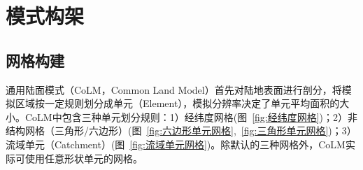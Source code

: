 \chapter{模式构架}\label{模式构架}
\section{网格构建}\label{网格构建}

通用陆面模式（CoLM，Common Land Model）首先对陆地表面进行剖分，将模拟区域按一定规则划分成单元（Element），模拟分辨率决定了单元平均面积的大小。CoLM中包含三种单元划分规则：1）经纬度网格(图~\ref{fig:经纬度网格})；2）非结构网格（三角形/六边形）(图~\ref{fig:六边形单元网格},~\ref{fig:三角形单元网格})；3）流域单元（Catchment）(图~\ref{fig:流域单元网格})。除默认的三种网格外，CoLM实际可使用任意形状单元的网格。

